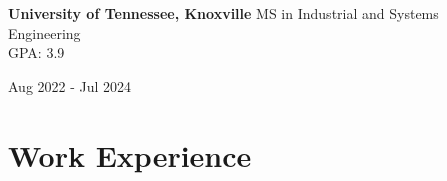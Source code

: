 \documentclass[10pt, letterpaper]{article}
\newenvironment{twocolentry}[2][]{
    \onecolentry
    \def\secondColumn{#2}
    \setcolumnwidth{\fill, 4.5 cm}
    \begin{paracol}{2}
}{
    \switchcolumn \raggedleft \secondColumn
    \end{paracol}
    \endonecolentry
} %
\begin{document}
\begin{twocolentry}{Aug 2022 - Jul 2024}
    \small \textbf{University of Tennessee, Knoxville} \textbar MS in Industrial and Systems Engineering\\
    GPA: 3.9
\end{twocolentry}






    







    

\section*{Work Experience}
\end{document}

